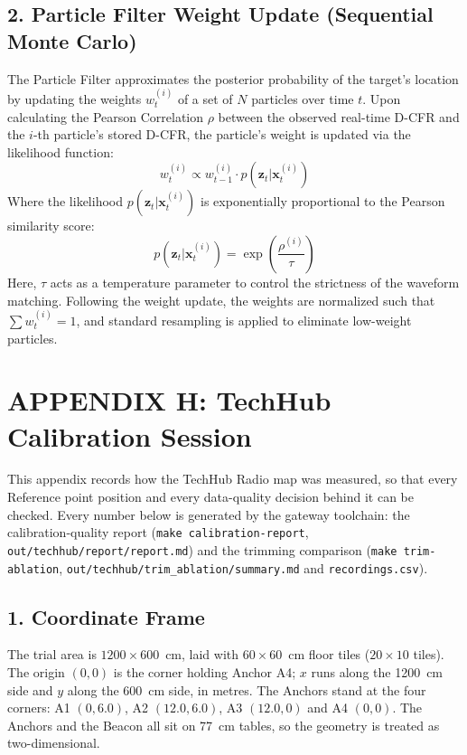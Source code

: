 \subsection*{2. Particle Filter Weight Update (Sequential Monte Carlo)}
The Particle Filter approximates the posterior probability of the target's location by updating the weights $w_t^{(i)}$ of a set of $N$ particles over time $t$. Upon calculating the Pearson Correlation $\rho$ between the observed real-time D-CFR and the $i$-th particle's stored D-CFR, the particle's weight is updated via the likelihood function:
\begin{equation}
    w_t^{(i)} \propto w_{t-1}^{(i)} \cdot p(\mathbf{z}_t | \mathbf{x}_t^{(i)})
\end{equation}
Where the likelihood $p(\mathbf{z}_t | \mathbf{x}_t^{(i)})$ is exponentially proportional to the Pearson similarity score:
\begin{equation}
    p(\mathbf{z}_t | \mathbf{x}_t^{(i)}) = \exp\left( \frac{\rho^{(i)}}{\tau} \right)
\end{equation}
Here, $\tau$ acts as a temperature parameter to control the strictness of the waveform matching. Following the weight update, the weights are normalized such that $\sum w_t^{(i)} = 1$, and standard resampling is applied to eliminate low-weight particles.
\clearpage

\section*{APPENDIX H: TechHub Calibration Session}
\label{app:techhub-calibration}

This appendix records how the TechHub Radio map was measured, so that every Reference point position and every data-quality decision behind it can be checked. Every number below is generated by the gateway toolchain: the calibration-quality report (\texttt{make calibration-report}, \texttt{out/techhub/report/report.md}) and the trimming comparison (\texttt{make trim-ablation}, \texttt{out/techhub/trim\_ablation/summary.md} and \texttt{recordings.csv}).

\subsection*{1. Coordinate Frame}
The trial area is $1200 \times 600$~cm, laid with $60 \times 60$~cm floor tiles ($20 \times 10$ tiles). The origin $(0,0)$ is the corner holding Anchor A4; $x$ runs along the 1200~cm side and $y$ along the 600~cm side, in metres. The Anchors stand at the four corners: A1 $(0, 6.0)$, A2 $(12.0, 6.0)$, A3 $(12.0, 0)$ and A4 $(0, 0)$. The Anchors and the Beacon all sit on 77~cm tables, so the geometry is treated as two-dimensional.

